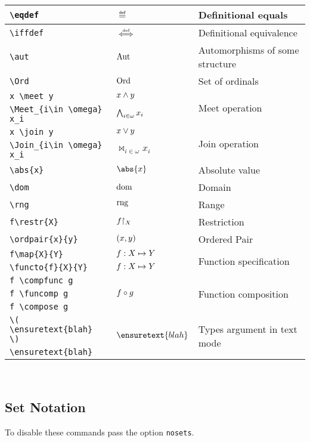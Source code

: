 \documentclass[leqno,11pt]{amsart}
\newcommand{\tab}{\hspace{1cm}}
\begin{document}
\begin{tabular}{l |  l | l}\toprule
	\verb=\eqdef= 					& \( \eqdef \) & Definitional equals\\ \midrule
	\verb=\iffdef= 					& \( \stackrel{\text{\tiny def}}{\iff} \) & Definitional equivalence\\	\midrule
	\verb=\aut= 					& \( \operatorname{Aut} \)  & Automorphisms of some structure\\ \midrule
	\verb=\Ord= 					& \( \operatorname{Ord} \) & Set of ordinals\\\midrule
	\verb=x \meet y= 				& \( x \mathbin{\wedge} y \) & \multirow{2}{*}{Meet operation} \\[6pt]
	\verb=\Meet_{i\in \omega} x_i=		& \( \mathop{\bigwedge}_{i\in \omega} x_i \) & \\ \midrule
	\verb=x \join y= 				& \(x  \mathbin{\vee} y \) & \multirow{2}{*}{Join operation}  \\[6pt]
	\verb=\Join_{i\in \omega} x_i=		& \( \Join_{i\in \omega} x_i \) & \\ \midrule
	\verb=\abs{x}= 					& \( \abs{x} \) & Absolute value\\ \midrule
	\verb=\dom= 					& \( \operatorname{dom} \) & Domain \\ \midrule
	\verb=\rng= 					& \( \operatorname{rng} \) & Range\\ \midrule
	\verb=f\restr{X}= 				& \( f\mathpunct{\restriction_{X}} \) & Restriction\\ \midrule
	\verb=\ordpair{x}{y}= 				& \( \left( x, y \right) \)& Ordered Pair\\ \midrule
	\verb=f\map{X}{Y}= 				& \( f:X\mapsto Y \) & \multirow{2}{*}{Function specification} \\
	\verb=\functo{f}{X}{Y}= 			& \( f:X\mapsto Y \) &\\ \midrule
	\verb=f \compfunc g=		       		& \multirow{3}{*}{\( f \compose g \)} & \multirow{3}{*}{Function composition}\\
	\tab \verb=f \funcomp g=	            		& &\\
	\tab \verb=f \compose g=	            		& &\\ \midrule
	\verb=\( \ensuretext{blah} \)=	           	& \multirow{2}{*}{\( \ensuretext{blah} \)}& \multirow{2}{*}{Types argument in text mode} \\
	\tab \verb=\ensuretext{blah}=			& & \\

	\bottomrule
\end{tabular}          \\
\newpage
\subsection{Set Notation}
To disable these commands pass the option \verb=nosets=.\\
\end{document}
